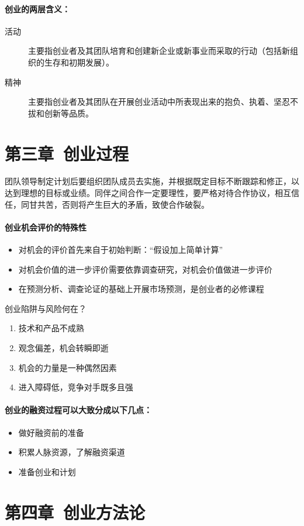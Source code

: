 \documentclass[UTF8]{ctexart}
\begin{document}
\paragraph{创业的两层含义：}
\begin{description}
\item[活动]主要指创业者及其团队培育和创建新企业或新事业而采取的行动（包括新组织的生存和初期发展）。
\item[精神]主要指创业者及其团队在开展创业活动中所表现出来的抱负、执着、坚忍不拔和创新等品质。
\end{description}
\section{第三章\ 创业过程}
团队领导制定计划后要组织团队成员去实施，并根据既定目标不断跟踪和修正，以达到理想的目标或业绩。同伴之间合作一定要理性，要严格对待合作协议，相互信任，同甘共苦，否则将产生巨大的矛盾，致使合作破裂。
\paragraph{创业机会评价的特殊性}
\begin{itemize}
    \item 对机会的评价首先来自于初始判断：“假设加上简单计算”
    \item	对机会价值的进一步评价需要依靠调查研究，对机会价值做进一步评价
    \item	在预测分析、调查论证的基础上开展市场预测，是创业者的必修课程
\end{itemize}
创业陷阱与风险何在？
\begin{enumerate}[1)]
\item 技术和产品不成熟
\item 观念偏差，机会转瞬即逝
\item 机会的力量是一种偶然因素
\item 进入障碍低，竞争对手既多且强
\end{enumerate}
\paragraph{创业的融资过程可以大致分成以下几点：}
\begin{itemize}
\item 做好融资前的准备
\item 积累人脉资源，了解融资渠道
\item 准备创业和计划
\end{itemize}

\section{第四章\ 创业方法论}
\end{document}

